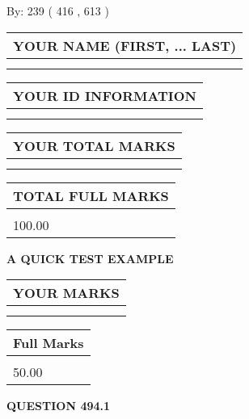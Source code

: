 \documentclass[12pt]{article}
\begin{document}
   
\hspace{1.0in} By: 
 239 ( 416 ,  613 )
   
   
   
   
\newpage 
\setcounter{page}{ 
   494001 } 
   
   
   
   
\noindent\begin{tabular}{|l|}
\hline
YOUR NAME (FIRST, ... LAST)  \\
\hline
 \\ 
 \\ 
\hline
\end{tabular}
\hspace{0.05in} \begin{tabular}{|l|}
\hline
 YOUR   ID   INFORMATION  \\
\hline
 \\ 
 \\ 
\hline
\end{tabular}
   
   
\vspace{0.2in}\noindent\begin{tabular}{|l|}
\hline
YOUR TOTAL MARKS  \\
\hline
 \\ 
 \\ 
\hline
\end{tabular}
\hspace{0.05in} \begin{tabular}{|l|}
\hline
TOTAL FULL MARKS  \\
\hline
 \\ 
100.00 \\
\hline
\end{tabular}
   
   
 \vspace{0.2in}
{\LARGE {\textbf{ A QUICK TEST EXAMPLE}}}
   
   
  
\vspace{0.2in}
  
\noindent\begin{tabular}{|l|}
\hline
 YOUR MARKS  \\
\hline
 \\ 
 \\ 
\hline
\end{tabular}
\hspace{0.05in} \begin{tabular}{|l|}
\hline
 Full Marks  \\
\hline
 \\ 
50.00 \\
\hline
\end{tabular}
{\textbf{\Large{QUESTION
494.1 
}}}
  
\end{document}
